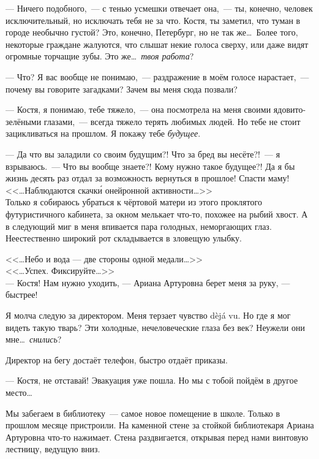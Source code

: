 \documentclass[openany, oneside]{book}
\begin{document}
--- Ничего подобного,~--- с тенью усмешки отвечает она,~--- ты, конечно, человек исключительный, но исключать тебя не за что. Костя, ты заметил, что туман в городе необычно густой? Это, конечно, Петербург, но не так же\dots \ Более того, некоторые граждане жалуются, что слышат некие голоса сверху, или даже видят огромные торчащие зубы. Это же\dots \ \textit{твоя работа}?

--- Что? Я вас вообще не понимаю,~--- раздражение в моём голосе нарастает,~--- почему вы говорите загадками? Зачем вы меня сюда позвали?

--- Костя, я понимаю, тебе тяжело,~--- она посмотрела на меня своими ядовито-зелёными глазами,~--- всегда тяжело терять любимых людей. Но тебе не стоит зацикливаться на прошлом. Я покажу тебе \textit{будущее}.

--- Да что вы заладили со своим будущим?! Что за бред вы несёте?!~--- я взрываюсь.~--- Что вы вообще знаете?! Кому нужно такое будущее?! Да я бы жизнь десять раз отдал за возможность вернуться в прошлое! Спасти маму!\\

<<\dots Наблюдаются скачк\'{и} онейронной активности\dots>>\\

Только я собираюсь убраться к чёртовой матери из этого проклятого футуристичного кабинета, за окном мелькает что-то, похожее на рыбий хвост. А в следующий миг в меня впивается пара голодных, неморгающих глаз. Неестественно широкий рот складывается в зловещую улыбку.

<<\dots Небо и вода --- две стороны одной медали\dots>>\\

<<\dots Успех. Фиксируйте\dots>>\\

--- Костя! Нам нужно уходить, --- Ариана Артуровна берет меня за руку, --- быстрее!

Я молча следую за директором. Меня терзает чувство d\`{e}j\'{a} vu. Но где я мог видеть такую тварь? Эти холодные, нечеловеческие глаза без век? Неужели они мне\dots \ \textit{снились}?

Директор на бегу достаёт телефон, быстро отдаёт приказы.

--- Костя, не отставай! Эвакуация уже пошла. Но мы с тобой пойдём в другое место\dots

Мы забегаем в библиотеку~--- самое новое помещение в школе. Только в прошлом месяце пристроили. На каменной стене за стойкой библиотекаря Ариана Артуровна что-то нажимает. Стена раздвигается, открывая перед нами винтовую лестницу, ведущую вниз.
\end{document}
